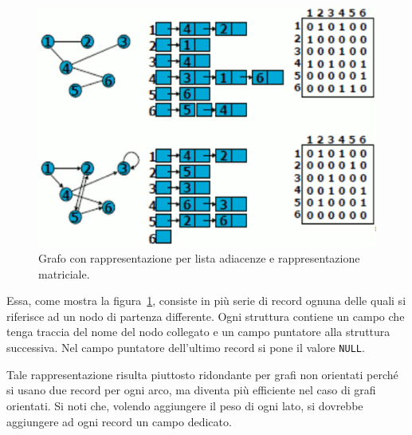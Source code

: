 \begin{itemize}
\begin{figure}[]
	\centering
\includegraphics[width=\columnwidth]{immagini/lista_adiacenze}
	\caption[Lista adiacenze]{Grafo con rappresentazione per lista adiacenze e rappresentazione matriciale.}
	\label{fig:adi}
\end{figure}
Essa, come mostra la figura~\ref{fig:adi}, consiste in più serie di record ognuna delle quali si riferisce ad un nodo di partenza differente.
Ogni struttura contiene un campo che tenga traccia del nome del nodo collegato e un campo puntatore alla struttura successiva.
Nel campo puntatore dell'ultimo record si pone il valore \lstinline!NULL!.

Tale rappresentazione risulta piuttosto ridondante per grafi non orientati perché si usano due record per ogni arco, ma diventa più efficiente nel caso di grafi orientati.
Si noti che, volendo aggiungere il peso di ogni lato, si dovrebbe aggiungere ad ogni record un campo dedicato.
\end{itemize}